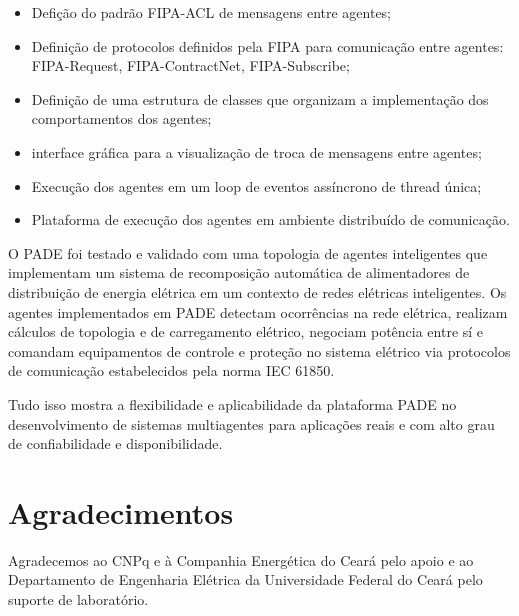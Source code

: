 \documentclass[journal]{IEEEtran}
\begin{document}
\begin{itemize}
    \item Defição do padrão FIPA-ACL de mensagens entre agentes;
    \item Definição de protocolos definidos pela FIPA para comunicação entre agentes: FIPA-Request, FIPA-ContractNet, FIPA-Subscribe;
    \item Definição de uma estrutura de classes que organizam a implementação dos comportamentos dos agentes;
    \item interface gráfica para a visualização de troca de mensagens entre agentes;
    \item Execução dos agentes em um loop de eventos assíncrono de thread única;
    \item Plataforma de execução dos agentes em ambiente distribuído de comunicação.
\end{itemize}

O PADE foi testado e validado com uma topologia de agentes inteligentes que implementam um sistema de recomposição automática de alimentadores de distribuição de energia elétrica em um contexto de redes elétricas inteligentes. Os agentes implementados em PADE detectam ocorrências na rede elétrica, realizam cálculos de topologia e de carregamento elétrico, negociam potência entre sí e comandam equipamentos de controle e proteção no sistema elétrico via protocolos de comunicação estabelecidos pela norma IEC 61850.

Tudo isso mostra a flexibilidade e aplicabilidade da plataforma PADE no desenvolvimento de sistemas multiagentes para aplicações reais e com alto grau de confiabilidade e disponibilidade.


\section*{Agradecimentos}

Agradecemos ao CNPq e à Companhia Energética do Ceará pelo apoio e ao Departamento de Engenharia Elétrica da Universidade Federal do Ceará pelo suporte de laboratório.


\ifCLASSOPTIONcaptionsoff
  \newpage
\fi



\end{document}
